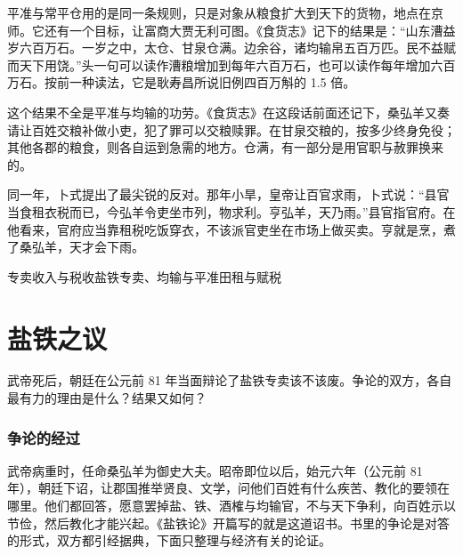 平准与常平仓用的是同一条规则，只是对象从粮食扩大到天下的货物，地点在京师。它还有一个目标，让富商大贾无利可图。《食货志》记下的结果是：“山东漕益岁六百万石。一岁之中，太仓、甘泉仓满。边余谷，诸均输帛五百万匹。民不益赋而天下用饶。”\cite{hanshu}头一句可以读作漕粮增加到每年六百万石，也可以读作每年增加六百万石。按前一种读法，它是耿寿昌所说旧例四百万斛的 1.5 倍。

这个结果不全是平准与均输的功劳。《食货志》在这段话前面还记下，桑弘羊又奏请让百姓交粮补做小吏，犯了罪可以交粮赎罪。在甘泉交粮的，按多少终身免役；其他各郡的粮食，则各自运到急需的地方\cite{hanshu}。仓满，有一部分是用官职与赦罪换来的。

同一年，卜式提出了最尖锐的反对。那年小旱，皇帝让百官求雨，卜式说：“县官当食租衣税而已，今弘羊令吏坐市列，物求利。亨弘羊，天乃雨。”\cite{hanshu}县官指官府。在他看来，官府应当靠租税吃饭穿衣，不该派官吏坐在市场上做买卖。亨就是烹，煮了桑弘羊，天才会下雨。

\begin{compare}{专卖收入与税收}{盐铁专卖、均输与平准}{田租与赋税}
\end{compare}

\section{盐铁之议}\label{sec:qinhan-debate}

武帝死后，朝廷在公元前 81 年当面辩论了盐铁专卖该不该废。争论的双方，各自最有力的理由是什么？结果又如何？

\subsubsection{争论的经过}
武帝病重时，任命桑弘羊为御史大夫\cite{hanshu}。昭帝即位以后，始元六年（公元前 81 年），朝廷下诏，让郡国推举贤良、文学，问他们百姓有什么疾苦、教化的要领在哪里。他们都回答，愿意罢掉盐、铁、酒榷与均输官，不与天下争利，向百姓示以节俭，然后教化才能兴起\cite{hanshu}。《盐铁论》开篇写的就是这道诏书\cite{yantielun}。书里的争论是对答的形式，双方都引经据典，下面只整理与经济有关的论证。


